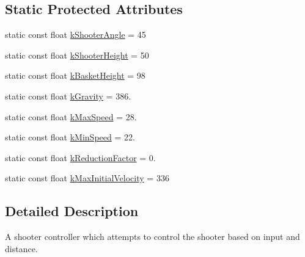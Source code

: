 \subsection*{\-Static \-Protected \-Attributes}
\begin{DoxyCompactItemize}
\item 
static const float \hyperlink{class_automatic_shooter_controller_a2a5aab0824b172bca27fd188fdbb4873}{k\-Shooter\-Angle} = 45
\item 
static const float \hyperlink{class_automatic_shooter_controller_a617aa6f12a30ffad7c9578b63475b68d}{k\-Shooter\-Height} = 50
\item 
static const float \hyperlink{class_automatic_shooter_controller_a0db08315209c6985ee8e52fb29fd1051}{k\-Basket\-Height} = 98
\item 
static const float \hyperlink{class_automatic_shooter_controller_a0d60d38ea93b309f275bd130d14e5fad}{k\-Gravity} = 386.
\item 
static const float \hyperlink{class_automatic_shooter_controller_a17d4c59fe8ca6352f1c1bdd43eeec20d}{k\-Max\-Speed} = 28.
\item 
static const float \hyperlink{class_automatic_shooter_controller_a6260f3704fe0b94ee49d3ca0ce527bd6}{k\-Min\-Speed} = 22.
\item 
static const float \hyperlink{class_automatic_shooter_controller_a2c2f9d0f918876ee3866a545f9096221}{k\-Reduction\-Factor} = 0.
\item 
static const float \hyperlink{class_automatic_shooter_controller_ad340d01d08043a58e41957371eb171a2}{k\-Max\-Initial\-Velocity} = 336
\end{DoxyCompactItemize}


\subsection{\-Detailed \-Description}
\-A shooter controller which attempts to control the shooter based on input and distance. 

